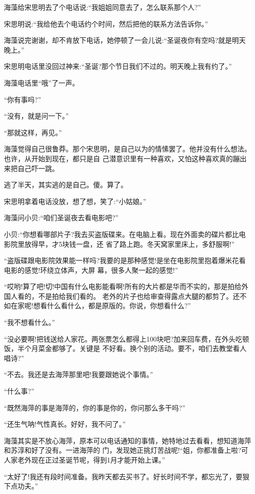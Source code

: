 \documentclass[11pt,a4paper,onecolumn]{article}
\begin{document}
海藻给宋思明去了个电话说:``我姐姐同意去了，怎么联系那个人?''

宋思明说:``我给他去个电话约个时间，然后把他的联系方法告诉你。''

海藻说完谢谢，却不肯放下电话，她停顿了一会儿说:``圣诞夜你有空吗?就是明天晚上。''

宋思明电话里没回过神来:``圣诞?那个节日我们不过的。明天晚上我有约了。''

海藻电话里``哦''了一声。

``你有事吗?''

``没有，就是问一下。''

``那就这样，再见。''

海藻觉得自己很鲁莽。那个宋思明，是自己以为的情愫罢了。他并没有什么想法。也许，从开始到现在，都只是自
己潜意识里有一种喜欢，又怕这种喜欢真的蹦出来把自己吓一跳。

逃了半天，其实逃的是自己。傻。算了。

宋思明拿着电话没放，想了想，笑了:``小姑娘。''

海藻问小贝:``咱们圣诞夜去看电影吧?''

小贝:``你想看哪部片子?我去买盗版碟来。在电脑上看。现在外面卖的碟片都比电影院里放得早，才5块钱一盘，还
省了路上跑。冬天窝家里床上，多舒服啊!''

``盗版碟跟电影院效果能一样吗?我要的是那种感觉!是坐在电影院里抱着爆米花看电影的感觉!环绕立体声，大屏
幕，很多人聚一起的感觉!''

``哎哟!算了吧!切!中国有什么电影能看啊!所有的大片都是华而不实的，那是拍给外国人看的，不是拍给我们看的。
老外的片子也给审查得露点大腿的都剪了。还不如在家呢!想看什么看什么，都是原版的。你说，你想看什么?''

``我不想看什么。''

``没必要啊!把钱送给人家花。两张票怎么都得上100块吧?加来回车费，在外头吃顿饭，半个月菜金都够了。关键是
不好看。换个别的活动。要不，咱们去教堂看人唱诗?''

``不去。我还是去海萍那里吧!我要跟她说个事情。''

``什么事?''

``既然海萍的事是海萍的，你的事是你的，你问那么多干吗?''

``还生气呐!气性真长。好好，我不问了。''

海藻其实是不放心海萍，原本可以电话通知的事情，她特地过去看看，想知道海萍和苏淳和好了没有。一进海萍的
门，发现她正挑灯苦战呢!``姐，你都准备上啦?可人家老外现在正过圣诞节呢，得到1月才能开始上课。''

``太好了!我还有段时间准备。我昨天都去买书了。好长时间不学，都忘光了，要狠下点功夫。''
\end{document}
